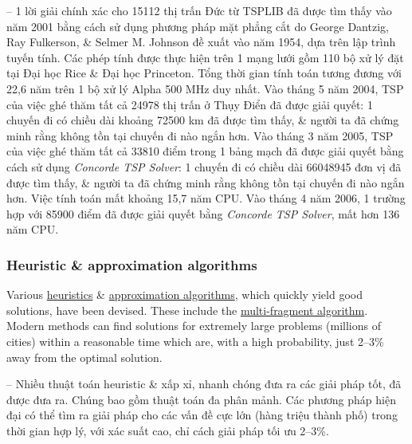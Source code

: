 \documentclass{article}
\begin{document}
-- 1 lời giải chính xác cho 15112 thị trấn Đức từ TSPLIB đã được tìm thấy vào năm 2001 bằng cách sử dụng phương pháp mặt phẳng cắt do {\sc George Dantzig}, {\sc Ray Fulkerson}, \& {\sc Selmer M. Johnson} đề xuất vào năm 1954, dựa trên lập trình tuyến tính. Các phép tính được thực hiện trên 1 mạng lưới gồm 110 bộ xử lý đặt tại Đại học Rice \& Đại học Princeton. Tổng thời gian tính toán tương đương với 22,6 năm trên 1 bộ xử lý Alpha 500 MHz duy nhất. Vào tháng 5 năm 2004, TSP của việc ghé thăm tất cả 24978 thị trấn ở Thụy Điển đã được giải quyết: 1 chuyến đi có chiều dài khoảng 72500 km đã được tìm thấy, \& người ta đã chứng minh rằng không tồn tại chuyến đi nào ngắn hơn. Vào tháng 3 năm 2005, TSP của việc ghé thăm tất cả 33810 điểm trong 1 bảng mạch đã được giải quyết bằng cách sử dụng {\it Concorde TSP Solver}: 1 chuyến đi có chiều dài 66048945 đơn vị đã được tìm thấy, \& người ta đã chứng minh rằng không tồn tại chuyến đi nào ngắn hơn. Việc tính toán mất khoảng 15,7 năm CPU. Vào tháng 4 năm 2006, 1 trường hợp với 85900 điểm đã được giải quyết bằng {\it Concorde TSP Solver}, mất hơn 136 năm CPU.


\subsubsection{Heuristic \& approximation algorithms}
Various \href{https://en.wikipedia.org/wiki/Heuristic_(computer_science)}{heuristics} \& \href{https://en.wikipedia.org/wiki/Approximation_algorithm}{approximation algorithms}, which quickly yield good solutions, have been devised. These include the \href{https://en.wikipedia.org/wiki/Multi-fragment_algorithm}{multi-fragment algorithm}. Modern methods can find solutions for extremely large problems (millions of cities) within a reasonable time which are, with a high probability, just 2--3\% away from the optimal solution.

-- Nhiều thuật toán heuristic \& xấp xỉ, nhanh chóng đưa ra các giải pháp tốt, đã được đưa ra. Chúng bao gồm thuật toán đa phân mảnh. Các phương pháp hiện đại có thể tìm ra giải pháp cho các vấn đề cực lớn (hàng triệu thành phố) trong thời gian hợp lý, với xác suất cao, chỉ cách giải pháp tối ưu 2--3\%.
\end{document}
